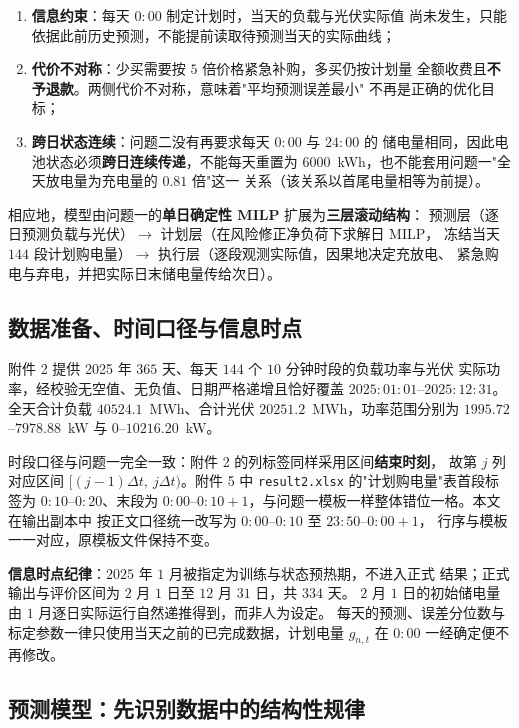 \documentclass[withoutpreface,bwprint]{cumcmthesis}
\begin{document}
\begin{enumerate}
  \item \textbf{信息约束}：每天 $0{:}00$ 制定计划时，当天的负载与光伏实际值
        尚未发生，只能依据此前历史预测，不能提前读取待预测当天的实际曲线；
  \item \textbf{代价不对称}：少买需要按 $5$ 倍价格紧急补购，多买仍按计划量
        全额收费且\textbf{不予退款}。两侧代价不对称，意味着"平均预测误差最小"
        不再是正确的优化目标；
  \item \textbf{跨日状态连续}：问题二没有再要求每天 $0{:}00$ 与 $24{:}00$ 的
        储电量相同，因此电池状态必须\textbf{跨日连续传递}，不能每天重置为
        $6000$~kWh，也不能套用问题一"全天放电量为充电量的 $0.81$ 倍"这一
        关系（该关系以首尾电量相等为前提）。
\end{enumerate}

相应地，模型由问题一的\textbf{单日确定性 MILP} 扩展为\textbf{三层滚动结构}：
预测层（逐日预测负载与光伏）$\to$ 计划层（在风险修正净负荷下求解日 MILP，
冻结当天 $144$ 段计划购电量）$\to$ 执行层（逐段观测实际值，因果地决定充放电、
紧急购电与弃电，并把实际日末储电量传给次日）。

\subsection{数据准备、时间口径与信息时点}

附件 2 提供 2025 年 $365$ 天、每天 $144$ 个 $10$ 分钟时段的负载功率与光伏
实际功率，经校验无空值、无负值、日期严格递增且恰好覆盖
$2025{:}01{:}01$--$2025{:}12{:}31$。全天合计负载 $40524.1$~MWh、合计光伏
$20251.2$~MWh，功率范围分别为 $1995.72$--$7978.88$~kW 与
$0$--$10216.20$~kW。

时段口径与问题一完全一致：附件 2 的列标签同样采用区间\textbf{结束时刻}，
故第 $j$ 列对应区间 $[(j-1)\Delta t,\ j\Delta t)$。附件 5 中
\texttt{result2.xlsx} 的"计划购电量"表首段标签为 $0{:}10$--$0{:}20$、末段为
$0{:}00$--$0{:}10{+}1$，与问题一模板一样整体错位一格。本文在输出副本中
按正文口径统一改写为 $0{:}00$--$0{:}10$ 至 $23{:}50$--$0{:}00{+}1$，
行序与模板一一对应，原模板文件保持不变。

\textbf{信息时点纪律}：$2025$ 年 $1$ 月被指定为训练与状态预热期，不进入正式
结果；正式输出与评价区间为 $2$ 月 $1$ 日至 $12$ 月 $31$ 日，共 $334$ 天。
$2$ 月 $1$ 日的初始储电量由 $1$ 月逐日实际运行自然递推得到，而非人为设定。
每天的预测、误差分位数与标定参数一律只使用当天之前的已完成数据，计划电量
$g_{n,t}$ 在 $0{:}00$ 一经确定便不再修改。

\subsection{预测模型：先识别数据中的结构性规律}
\end{document}
